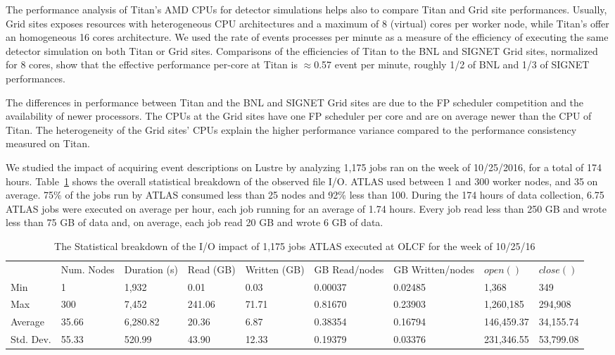 The performance analysis of Titan's AMD CPUs for detector simulations helps also
to compare Titan and Grid site performances. Usually, Grid sites exposes
resources with heterogeneous CPU architectures and a maximum of 8 (virtual)
cores per worker node, while Titan's offer an homogeneous 16 cores architecture.
We used the rate of events processes per minute as a measure of the efficiency
of executing the same detector simulation on both Titan or Grid sites.
Comparisons of the efficiencies of Titan to  the BNL and SIGNET Grid sites,
normalized for 8 cores, show that the effective performance per-core at Titan is
$\approx$0.57 event per minute, roughly 1/2 of BNL and  1/3 of SIGNET
performances.

The differences in performance between Titan and the BNL and SIGNET Grid sites
are due to the FP scheduler competition and the availability of newer
processors. The CPUs at the Grid sites have one FP scheduler per core and are on
average newer than the CPU of Titan. The heterogeneity of the Grid sites' CPUs
explain the higher performance variance compared to the performance consistency
measured on Titan.

We studied the impact of acquiring event descriptions on Lustre by analyzing
1,175 jobs ran on the week of 10/25/2016, for a total of 174 hours.
Table~\ref{panda-olcf-stats} shows the overall statistical breakdown of the
observed file I/O. ATLAS used between 1 and 300 worker nodes, and 35 on average.
75\% of the jobs run by ATLAS consumed less than 25 nodes and 92\% less than
100. During the 174 hours of data collection, 6.75 ATLAS jobs were executed on
average per hour, each job running for an average of 1.74 hours. Every job read
less than 250 GB and wrote less than 75 GB of data and, on average, each job
read 20 GB and wrote 6 GB of data.

\begin{table}[t]
\centering
\begin{tabular}{lllllllll}
 & Num. Nodes & Duration (s) & Read (GB) & Written (GB) & GB Read/nodes & GB Written/nodes & $open()$ & $close()$ \\
Min & 1 & 1,932 & 0.01 & 0.03 & 0.00037 & 0.02485 & 1,368 & 349 \\
Max & 300 & 7,452 & 241.06 & 71.71 & 0.81670 & 0.23903 & 1,260,185 & 294,908 \\
Average & 35.66 & 6,280.82 & 20.36 & 6.87 & 0.38354 & 0.16794 & 146,459.37 & 34,155.74 \\
Std. Dev. & 55.33 & 520.99 & 43.90 & 12.33 & 0.19379 & 0.03376 & 231,346.55 & 53,799.08
\end{tabular}
\caption{The Statistical breakdown of the I/O impact of 1,175 jobs ATLAS executed at OLCF for the week of 10/25/16}
\label{panda-olcf-stats}
\end{table}

